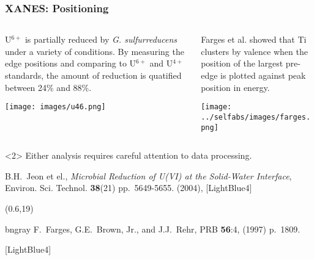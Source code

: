 \documentclass[10pt, xcolor=x11names, compress]{beamer}
\begin{document}
\begin{frame}
  \frametitle{XANES: Positioning}
  \begin{columns}[T]
    \begin{column}{0.5\linewidth}
      \small%
      U$^{6+}$ is partially reduced by \textit{G. sulfurreducens}
      under a variety of conditions.  By measuring the edge positions
      and comparing to U$^{6+}$ and U$^{4+}$ standards,
      the amount of reduction is quatified between 24\% and 88\%.

      \texttt{[image: images/u46.png]}      
    \end{column}
    \begin{column}{0.5\linewidth}
      \small%
      Farges et al. showed that Ti clusters by valence when the
      position of the largest {\color{red}pre-edge} is plotted against
      peak position in energy.

      \texttt{[image: ../selfabs/images/farges.png]}      
    \end{column}
  \end{columns}
  \begin{exampleblock}<2>{}
    \small%
    \qquad Either analysis requires careful attention to data processing.
  \end{exampleblock}
  \begin{bottomnote}[0.5][19]
    B.H.\ Jeon et el., \textit{Microbial Reduction of U(VI) at the
      Solid-Water Interface}, Environ. Sci. Technol. \textbf{38}(21)
    pp.~5649-5655. (2004), [LightBlue4]
  \end{bottomnote}
  \begin{textblock*}{0.4\linewidth}(0.6\linewidth,19\TPVertModule)
    \tiny%
    \begin{color}{bngray}
      F.~Farges, G.E.~Brown, Jr., and J.J.~Rehr, PRB \textbf{56}:4,
      (1997) p.\ 1809.
    \end{color}
    [LightBlue4]
  \end{textblock*}

\end{frame}
\end{document}
